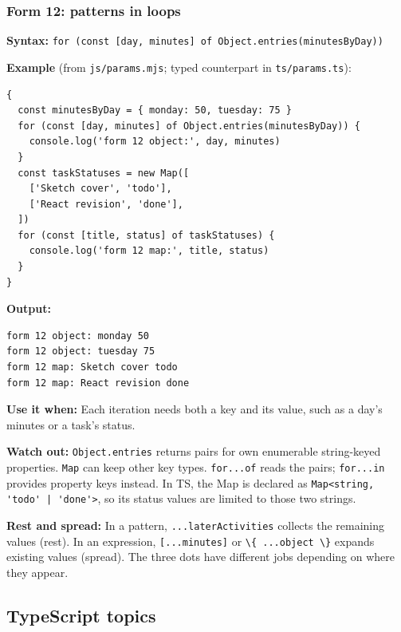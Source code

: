 \documentclass[
  11pt,
]{article}
\newcommand{\passthrough}[1]{#1}
\begin{document}
\subsubsection{Form 12: patterns in
loops}\label{form-12-patterns-in-loops}

\textbf{Syntax:}
\passthrough{\lstinline!for (const [day, minutes] of Object.entries(minutesByDay))!}

\textbf{Example} (from \passthrough{\lstinline!js/params.mjs!}; typed
counterpart in \passthrough{\lstinline!ts/params.ts!}):

\begin{lstlisting}
{
  const minutesByDay = { monday: 50, tuesday: 75 }
  for (const [day, minutes] of Object.entries(minutesByDay)) {
    console.log('form 12 object:', day, minutes)
  }
  const taskStatuses = new Map([
    ['Sketch cover', 'todo'],
    ['React revision', 'done'],
  ])
  for (const [title, status] of taskStatuses) {
    console.log('form 12 map:', title, status)
  }
}
\end{lstlisting}

\textbf{Output:}

\begin{lstlisting}
form 12 object: monday 50
form 12 object: tuesday 75
form 12 map: Sketch cover todo
form 12 map: React revision done
\end{lstlisting}

\textbf{Use it when:} Each iteration needs both a key and its value,
such as a day's minutes or a task's status.

\textbf{Watch out:} \passthrough{\lstinline!Object.entries!} returns
pairs for own enumerable string-keyed properties.
\passthrough{\lstinline!Map!} can keep other key types.
\passthrough{\lstinline!for...of!} reads the pairs;
\passthrough{\lstinline!for...in!} provides property keys instead. In
TS, the Map is declared as
\passthrough{\lstinline!Map<string, 'todo' | 'done'>!}, so its status
values are limited to those two strings.

\textbf{Rest and spread:} In a pattern,
\passthrough{\lstinline!...laterActivities!} collects the remaining
values (rest). In an expression, \passthrough{\lstinline![...minutes]!}
or \passthrough{\lstinline!\{ ...object \}!} expands existing values
(spread). The three dots have different jobs depending on where they
appear.

\subsection{TypeScript topics}\label{typescript-topics}
\end{document}
